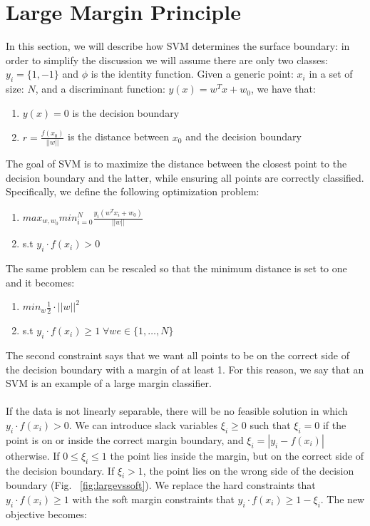 \documentclass[LaM,binding=0.6cm]{sapthesis}
\begin{document}
\section{Large Margin Principle}
In this section, we will describe how SVM determines the surface boundary: in order to simplify the discussion we will assume there are only two classes: $y_i=\{1,-1\}$ and $\phi$ is the identity function. Given a generic point: $x_i$ in a set of size: $N$, and a discriminant function: $y(x)=w^Tx+w_0$, we have that:
\begin{enumerate}
\item $y(x)=0$ is the decision boundary
\item $r=\frac{f(x_0)}{||w||}$ is the distance between $x_0$ and the decision boundary
\end{enumerate}
The goal of SVM is to maximize the distance between the closest point to the decision boundary and the latter, while ensuring all points are correctly classified. Specifically, we define the following optimization problem:
\begin{enumerate}
\item $max_{w,w_0}min_{i=0}^N\frac{y_i(w^Tx_i+w_0)}{||w||}$ 
\item s.t $y_i\cdot f(x_i)>0$
\end{enumerate}
The same problem can be rescaled so that the minimum distance is set to one and it becomes:
\begin{enumerate}
\item $min_{w} \frac{1}{2}\cdot||w||^2$ 
\item s.t $y_i\cdot f(x_i)\geq1 \; \forall we \in \{1,\dots,N\}$
\end{enumerate}
The second constraint says that we want all points to be on the correct side of the decision boundary with a margin of at least 1. For this reason, we say that an SVM is an example of a large margin classifier.\\\\If the data is not linearly separable, there will be no feasible solution in which $y_i\cdot f(x_i)>0$. We can introduce slack variables $\xi_i\geq 0$ such that $\xi_i = 0$ if the point is on or inside the correct margin boundary, and $\xi_i = |y_i - f(x_i)|$ otherwise. If $0 \leq \xi_i\leq 1$ the point lies inside the margin, but on the correct side of the decision boundary. If $\xi_i > 1$, the point lies on the wrong side of the decision boundary (Fig. ~\ref{fig:largevssoft}). We replace the hard constraints that $y_i\cdot f(x_i) \geq 1$ with the soft margin constraints that $y_i\cdot f(x_i)\geq 1 - \xi_i$. The new objective becomes:
\end{document}
